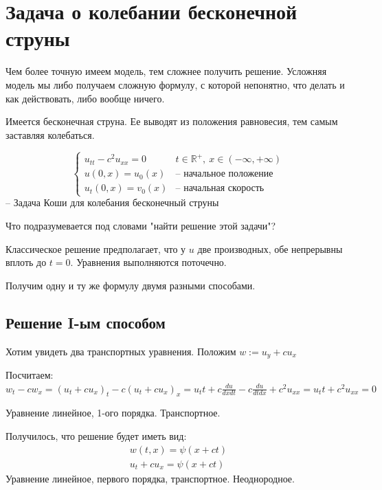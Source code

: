\documentclass[12pt]{report}
\begin{document}
\section{Задача о колебании бесконечной струны}

Чем более точную имеем модель, тем сложнее получить решение. Усложняя модель мы либо получаем сложную формулу, с которой непонятно, что делать и как действовать, либо вообще ничего. 

Имеется бесконечная струна. Ее выводят из положения равновесия, тем самым заставляя колебаться. 

\begin{equation} \label{pro:CauchyWave}
    \begin{cases}
        u_{tt} - c ^ 2 u_{xx} = 0 & t \in \mathbb{R} ^ +, \: x \in (-\infty, +\infty)
        \\
        u(0,x) = u_0(x) & \text{-- начальное положение}
        \\
        u_t(0, x) = v_0(x) & \text{-- начальная скорость}
    \end{cases}
\end{equation}
-- Задача Коши для колебания бесконечный струны

Что подразумевается под словами "найти решение этой задачи"?

Классическое решение предполагает, что у $u$ две производных, обе непрерывны вплоть до $t = 0$. Уравнения выполняются поточечно. 

Получим одну и ту же формулу двумя разными способами. 

\subsection{Решение I-ым способом}

Хотим увидеть два транспортных уравнения. Положим $w := u_y + cu_x$

Посчитаем: $w_t - c w_x = (u_t + c u_x)_t - c(u_t + c u_x)_x = u_tt + c \frac{du}{dxdt} - c \frac{du}{dtdx} + c ^ 2 u_{xx} = u_tt + c ^ 2 u_{xx} = 0$

Уравнение линейное, 1-ого порядка. Транспортное. 

Получилось, что решение будет иметь вид: 
\[
    \begin{gathered}
        w(t,x) = \psi(x + ct)
        \\
        u_t + c u_x = \psi(x + ct)
    \end{gathered}
\]
 Уравнение линейное, первого порядка, транспортное. Неоднородное. 
 
\end{document}
